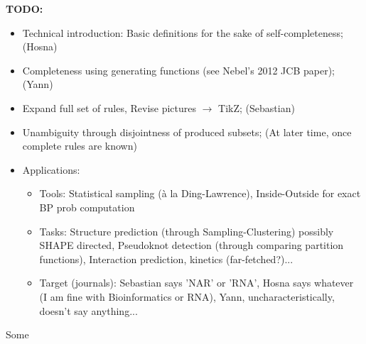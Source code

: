 \documentclass[11pt]{article} %
\begin{document}
\newpage
{\bf TODO:}
\begin{itemize}
  \item Technical introduction: Basic definitions for the sake of self-completeness; (Hosna)
  \item Completeness using generating functions (see Nebel's 2012 JCB paper); (Yann)
  \item Expand full set of rules, Revise pictures $\to$ TikZ; (Sebastian)
  \item Unambiguity through disjointness of produced subsets; (At later time, once complete rules are known)
  \item Applications: 
  \begin{itemize}
    \item Tools: Statistical sampling (à la Ding-Lawrence), Inside-Outside for exact BP prob computation
    \item Tasks: Structure prediction (through Sampling-Clustering) possibly SHAPE directed, Pseudoknot detection (through comparing partition functions), Interaction prediction, kinetics (far-fetched?)...
    \item Target (journals): Sebastian says 'NAR' or 'RNA', Hosna says whatever (I am fine with Bioinformatics or RNA), Yann, uncharacteristically, doesn't say anything...
  \end{itemize}
\end{itemize}


Some
\end{document}
